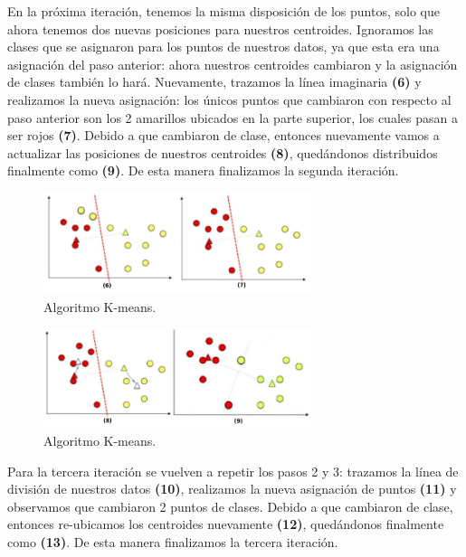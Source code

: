 \documentclass[12pt,a4paper]{article}
\begin{document}
\begin{sloppypar}
En la próxima iteración, tenemos la misma disposición de los puntos, solo que ahora tenemos dos nuevas posiciones para nuestros centroides. Ignoramos las clases que se asignaron para los puntos de nuestros datos, ya que esta era una asignación del paso anterior: ahora nuestros centroides cambiaron y la asignación de clases también lo hará. Nuevamente, trazamos la línea imaginaria \textbf{(6)} y realizamos la nueva asignación: los únicos puntos que cambiaron con respecto al paso anterior son los 2 amarillos ubicados en la parte superior, los cuales pasan a ser rojos \textbf{(7)}. Debido a que cambiaron de clase, entonces nuevamente vamos a actualizar las posiciones de nuestros centroides \textbf{(8)}, quedándonos distribuidos finalmente como \textbf{(9)}. De esta manera finalizamos la segunda iteración. 

\begin{figure}[H]    %
 \centering
 \includegraphics[width=0.7\textwidth]{images/K_Means_3.png}
 \captionsetup{justification=centering,margin=2cm}
 \caption{Algoritmo K-means.}
\end{figure}

\begin{figure}[H]    %
 \centering
 \includegraphics[width=0.7\textwidth]{images/K_Means_4.png}
 \captionsetup{justification=centering,margin=2cm}
 \caption{Algoritmo K-means.}
\end{figure}

Para la tercera iteración se vuelven a repetir los pasos 2 y 3: trazamos la línea de división de nuestros datos \textbf{(10)}, realizamos la nueva asignación de puntos \textbf{(11)} y observamos que cambiaron 2 puntos de clases. Debido a que cambiaron de clase, entonces re-ubicamos los centroides nuevamente \textbf{(12)}, quedándonos finalmente como \textbf{(13)}. De esta manera finalizamos la tercera iteración. 


\end{sloppypar}
\end{document}
